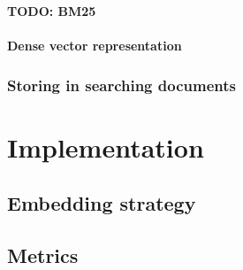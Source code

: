 \documentclass{article}
\begin{document}
\textbf{TODO: BM25}

\paragraph{Dense vector representation}

\subsubsection{Storing in searching documents}

\section{Implementation}
\subsection{Embedding strategy}
\subsection{Metrics}

\newpage


\end{document}
